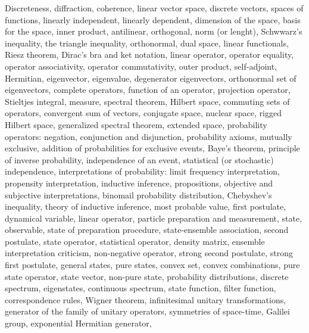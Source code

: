 

\usepackage[english]{babel}




\begin{multicols}{3}
  Discreteness,
  diffraction,
  coherence,
  linear vector space,
  discrete vectors,
  spaces of functions,
  linearly independent,
  linearly dependent,
  dimension of the space,
  basis for the space,
  inner product,
  antilinear,
  orthogonal,
  norm (or lenght),
  Schwwarz's inequality,
  the triangle inequality,
  orthonormal,
  dual space,
  linear functionals,
  Riesz theorem,
  Dirac's bra and ket notation,
  linear operator,
  operator equality,
  operator associativity,
  operator commutativity,
  outer product,
  self-adjoint,
  Hermitian,
  eigenvector,
  eigenvalue,
  degenerator eigenvectors,
  orthonormal set of eigenvectors,
  complete operators,
  function of an operator,
  projection operator,
  Stieltjes integral,
  measure,
  spectral theorem,
  Hilbert space,
  commuting sets of operators,
  convergent sum of vectors,
  conjugate space,
  nuclear space,
  rigged Hilbert space,
  generalized spectral theorem,
  extended space,
  probability operators: negation, conjunction and disjunction,
  probability axioms,
  mutually exclusive,
  addition of probabilities for exclusive events,
  Baye's theorem,
  principle of inverse probability,
  independence of an event,
  statistical (or stochastic) independence,
  interpretations of probability:
  limit frequency interpretation, propensity interpretation,
  inductive inference, propositions, objective and subjective interpretations,
  binomail probability distribution,
  Chebyshev's inequality,
  theory of inductive inference,
  most probable value,
  first postulate,
  dynamical variable,
  linear operator,
  particle preparation and measurement,
  state,
  observable,
  state of preparation procedure,
  state-ensemble association,
  second postulate,
  state operator,
  statistical operator,
  density matrix,
  ensemble interpretation criticism,
  non-negative operator,
  strong second postulate,
  strong first postulate,
  general states,
  pure states,
  convex set,
  convex combinations,
  pure state operator,
  state vector,
  non-pure state,
  probability distributions,
  discrete spectrum,
  eigenstates,
  continuous spectrum,
  state function,
  filter function,
  correspondence rules,
  Wigner theorem,
  infinitesimal unitary transformations,
  generator of the family of unitary operators,
  symmetries of space-time,
  Galilei group,
  exponential Hermitian generator,

\end{multicols}
